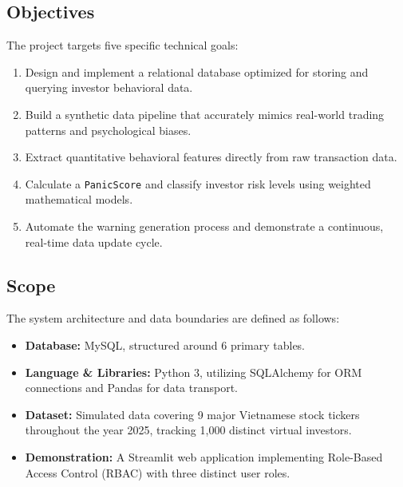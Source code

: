 \subsection{Objectives}
The project targets five specific technical goals:
\begin{enumerate}
    \item Design and implement a relational database optimized for storing and querying investor behavioral data.
    \item Build a synthetic data pipeline that accurately mimics real-world trading patterns and psychological biases.
    \item Extract quantitative behavioral features directly from raw transaction data.
    \item Calculate a \texttt{PanicScore} and classify investor risk levels using weighted mathematical models.
    \item Automate the warning generation process and demonstrate a continuous, real-time data update cycle.
\end{enumerate}

\subsection{Scope}
The system architecture and data boundaries are defined as follows:
\begin{itemize}
    \item \textbf{Database:} MySQL, structured around 6 primary tables.
    \item \textbf{Language \& Libraries:} Python 3, utilizing SQLAlchemy for ORM connections and Pandas for data transport.
    \item \textbf{Dataset:} Simulated data covering 9 major Vietnamese stock tickers throughout the year 2025, tracking 1,000 distinct virtual investors.
    \item \textbf{Demonstration:} A Streamlit web application implementing Role-Based Access Control (RBAC) with three distinct user roles.
\end{itemize}

